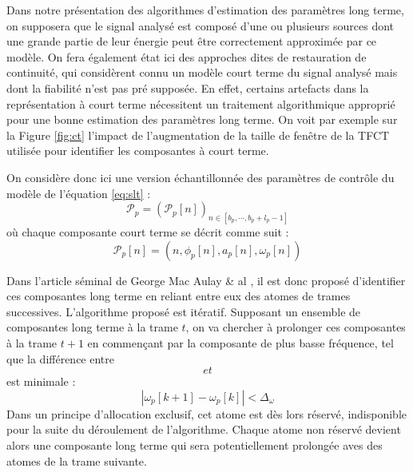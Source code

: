 Dans notre présentation des algorithmes d'estimation des paramètres long terme, on supposera que le signal analysé est composé d'une ou plusieurs sources dont une grande partie de leur énergie peut être correctement approximée par ce modèle. On fera également état ici des approches dites de \og restauration \fg de continuité, qui considèrent connu un modèle court terme du signal analysé mais dont la fiabilité n'est pas pré supposée. En effet, certains artefacts dans la représentation à court terme nécessitent un traitement algorithmique approprié pour une bonne estimation des paramètres long terme. On voit par exemple sur la Figure \ref{fig:ct} l'impact de l'augmentation de la taille de fenêtre de la TFCT utilisée pour identifier les composantes à court terme.

On considère donc ici une version échantillonnée des paramètres de contrôle du modèle de l'équation \ref{eq:slt} :
\begin{equation}
\mathcal{P}_{p}=\left(\mathcal{P}_{p}[n]\right)_{n \in\left[b_{p}, \cdots, b_{p}+l_{p}-1\right]}
\end{equation}
où chaque composante court terme se décrit comme suit :
\begin{equation}
\mathcal{P}_{p}[n]=\left(n, \phi_{p}[n], a_{p}[n], \omega_{p}[n]\right)
\end{equation}

Dans l'article séminal de George Mac Aulay \& al \cite{mcaulay}, il est donc proposé \og d'identifier \fg ces composantes long terme en reliant entre eux des atomes de trames successives. L'algorithme proposé est itératif. Supposant un ensemble de composantes long terme à la trame $t$, on va chercher à prolonger ces composantes à la trame $t+1$ en commençant par la composante de plus basse fréquence, tel que la différence entre $$ et $$ est minimale :
\begin{equation}
\left|\omega_{p}[k+1]-\omega_{p}[k]\right|<\Delta_{\omega}
\label{eq:cst}
\end{equation}
Dans un principe d'allocation exclusif, cet atome est dès lors réservé, indisponible pour la suite du déroulement de l'algorithme. Chaque atome non réservé devient alors une composante long terme qui sera potentiellement prolongée aves des atomes de la trame suivante.

